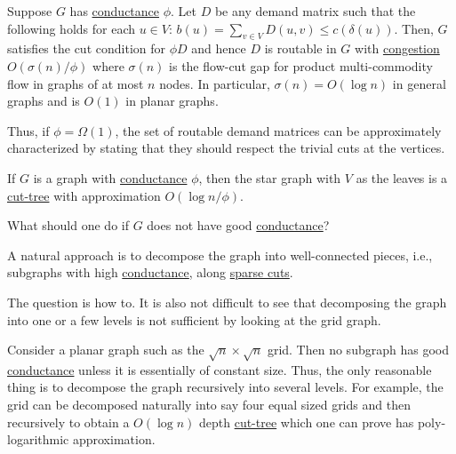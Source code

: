 \begin{claim}
	Suppose \(G\) has \hyperref[def:conductance]{conductance} \(\phi \). Let \(D\) be any demand matrix such that the following holds for each \(u \in V\): \(b(u) = \sum_{v \in V} D(u, v) \leq c(\delta (u))\). Then, \(G\) satisfies the cut condition for \(\phi D\) and hence \(D\) is routable in \(G\) with \hyperref[def:congestion]{congestion} \(O(\sigma (n) / \phi )\) where \(\sigma (n)\) is the flow-cut gap for product multi-commodity flow in graphs of at most \(n\) nodes. In particular, \(\sigma (n) = O(\log n)\) in general graphs and is \(O(1)\) in planar graphs.
\end{claim}

Thus, if \(\phi = \Omega (1)\), the set of routable demand matrices can be approximately characterized by stating that they should respect the trivial cuts at the vertices.

\begin{eg}[Expander]
	If \(G\) is a graph with \hyperref[def:conductance]{conductance} \(\phi \), then the star graph with \(V\) as the leaves is a \hyperref[def:cut-tree]{cut-tree} with approximation \(O(\log n / \phi )\).
	\begin{center}
	\end{center}
\end{eg}

What should one do if \(G\) does not have good \hyperref[def:conductance]{conductance}?

\begin{intuition}
	A natural approach is to decompose the graph into well-connected pieces, i.e., subgraphs with high \hyperref[def:conductance]{conductance}, along \hyperref[prb:non-uniform-sparsest-cut]{sparse cuts}.
\end{intuition}

The question is how to. It is also not difficult to see that decomposing the graph into one or a few levels is not sufficient by looking at the grid graph.

\begin{eg}[Grid]
	Consider a planar graph such as the \(\sqrt{n} \times \sqrt{n} \) grid. Then no subgraph has good \hyperref[def:conductance]{conductance} unless it is essentially of constant size. Thus, the only reasonable thing is to decompose the graph recursively into several levels. For example, the grid can be decomposed naturally into say four equal sized grids and then recursively to obtain a \(O(\log n)\) depth \hyperref[def:cut-tree]{cut-tree} which one can prove has poly-logarithmic approximation.
	\begin{center}
	\end{center}
\end{eg}

